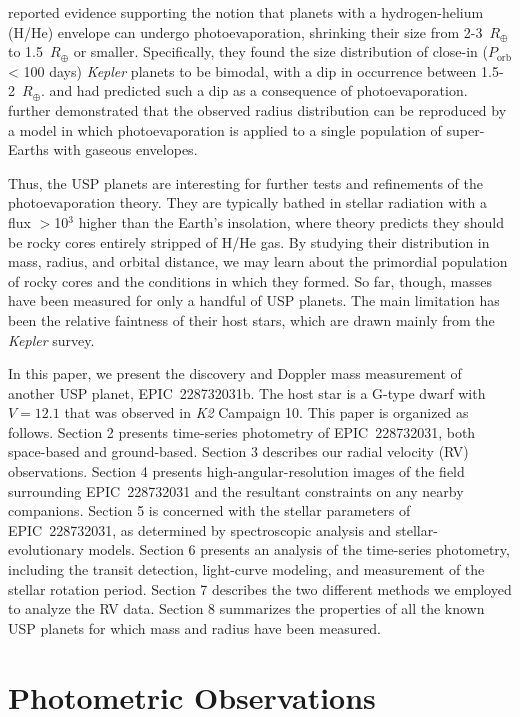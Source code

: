 \documentclass[twocolumn]{aastex61}
\begin{document}
\citet{Fulton2017} reported evidence supporting the notion that planets with a hydrogen-helium (H/He) envelope can undergo photoevaporation, shrinking their size from 2-3~$R_{\oplus}$ to 1.5~$R_\oplus$ or smaller. Specifically, they found the size distribution of close-in ($P_{\text{orb}}$ < 100 days) {\it Kepler} planets to be bimodal, with a dip in occurrence between 1.5-2~$R_\oplus$.
\citet{Owen2013} and \citet{Lopez2014} had predicted such a dip as a consequence of photoevaporation.
\citet{Owen2017} further demonstrated that the observed radius distribution can be reproduced by a model in which photoevaporation is applied to a single population of super-Earths with gaseous envelopes.

Thus, the USP planets are interesting for further tests and refinements of the photoevaporation theory. They are typically bathed in stellar radiation with a flux $>$10$^3$ higher than the Earth's insolation, where theory predicts they should be rocky cores entirely stripped of H/He gas. By studying their distribution in mass, radius, and orbital distance, we may learn about the primordial population of rocky cores and the conditions in which they formed. So far, though, masses have been measured for only a handful of USP planets. The main limitation has been the relative faintness of their host stars, which are drawn mainly from the {\it Kepler} survey.

In this paper, we present the discovery and Doppler mass measurement of another USP planet,
EPIC~228732031b. The host star is a G-type dwarf with $V=12.1$
that was observed in {\it K2} Campaign 10.
This paper is organized as follows. Section 2 presents time-series photometry of EPIC~228732031, both space-based and ground-based. Section 3 describes our radial velocity (RV) observations.
Section 4 presents high-angular-resolution images of the field surrounding EPIC~228732031 and the resultant constraints on any nearby companions. Section 5 is concerned with the stellar parameters of EPIC~228732031, as determined by spectroscopic analysis and stellar-evolutionary models.
Section 6 presents an analysis of the time-series photometry, including the transit detection, light-curve modeling, and measurement of the stellar rotation period.
Section 7 describes the two different methods we employed to analyze the RV data.
Section 8 summarizes the properties of all the known USP planets for which mass and radius have
been measured.

\section{Photometric Observations}
\end{document}
